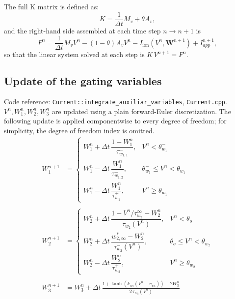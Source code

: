 \documentclass{Configuration_Files/PoliMi3i_thesis}
\newcommand{\tanhop}{\tanh}
\begin{document}
The full K matrix is defined as:
\begin{equation}
K = \frac{1}{\Delta t}M_v + \theta A_v,
\label{eq:lhs}
\end{equation}
and the right-hand side assembled at each time step $n\to n+1$ is
\begin{equation}
F^{n} = \frac{1}{\Delta t}M_v V^n - (1-\theta) A_v V^n - I_{\mathrm{ion}}(V^{n},\mathbf W^{n+1})
+ I_{app}^{n+1},
\label{eq:rhs}
\end{equation}
so that the linear system solved at each step is $K\,V^{n+1} = F^n$.

\subsection{Update of the gating variables}
\label{sec:gate-update}
Code reference: \texttt{Current::integrate\_auxiliar\_variables}, \texttt{Current.cpp}.\\ $V^n, W^n_1, W^n_2, W^n_3$ are updated using a plain forward-Euler discretization.
The following update is applied componentwise to every degree of freedom; for simplicity, the degree of freedom index is omitted.\\



\begin{align*}
W^{n+1}_{1}
&=
\begin{cases}
W^n_1 + \Delta t\,\dfrac{1-  W^n_1}{\tau_{w_{1,1}}^-}, & V^n<\theta_{w_1}^-\\[1.5em]
W^n_1 - \Delta t\,\dfrac{W^n_1}{\tau_{w_{1,2}}^-}, & \theta_{w_1}^-\le V^n<\theta_{w_1}\\[1.5em]
W^n_1 - \Delta t\,\dfrac{W^n_1}{\tau_{w_1}^+}, & V^n\ge\theta_{w_1}
\end{cases}\\
\\
W_2^{n+1} &=
\begin{cases}
W^n_2 + \Delta t\,\dfrac{1-V^n/\tau_{w_2}^\infty - W^n_2}{\tau_{w_2}^-(V^n)}, & V^n<\theta_o\\[1.5em]
W^n_2 + \Delta t\,\dfrac{w_{2,\infty}^\ast - W_2^n}{\tau_{w_2}^-(V^n)}, & \theta_o\le V^n<\theta_{w_2}\\[1.5em]
W^n_2 - \Delta t\,\dfrac{W^n_2}{\tau_{w_2}^+}, & V^n\ge\theta_{w_2}
\end{cases}\\
\\
W^{n+1}_3 &= W^n_3 + \Delta t\,\frac{1+\tanhop(k_{w_3}(V^n-v_{w_3})) - 2W^n_3}{2\,\tau_{w_3}(V^n)}
\end{align*}
\end{document}
